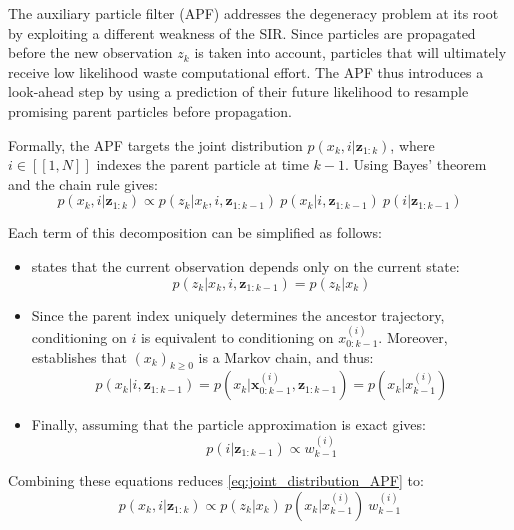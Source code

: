 The auxiliary particle filter (APF) addresses the degeneracy problem at its root by exploiting a different weakness of the SIR. Since particles are propagated before the new observation $z_k$ is taken into account, particles that will ultimately receive low likelihood waste computational effort. The APF thus introduces a look-ahead step by using a prediction of their future likelihood to resample promising parent particles before propagation.

Formally, the APF targets the joint distribution $p(x_k,i|\mathbf{z}_{1:k})$, where $i\in[\![1,N]\!]$ indexes the parent particle at time $k-1$. Using Bayes' theorem and the chain rule gives:
\begin{equation}
	p(x_k,i|\mathbf{z}_{1:k})\propto p(z_k|x_k,i,\mathbf{z}_{1:k-1})\:p(x_k|i,\mathbf{z}_{1:k-1})\:p(i|\mathbf{z}_{1:k-1})\label{eq:joint_distribution_APF}
\end{equation}

Each term of this decomposition can be simplified as follows:
\begin{itemize}
	\item{} states that the current observation depends only on the current state:
	\begin{equation}
		p(z_k|x_k,i,\mathbf{z}_{1:k-1})=p(z_k|x_k)
	\end{equation}
	\item Since the parent index uniquely determines the ancestor trajectory, conditioning on $i$ is equivalent to conditioning on $x_{0:k-1}^{(i)}$. Moreover,  establishes that $(x_k)_{k\geq0}$ is a Markov chain, and thus:
	\begin{equation}
		p(x_k|i,\mathbf{z}_{1:k-1})=p\left(x_k|\mathbf{x}_{0:k-1}^{(i)},\mathbf{z}_{1:k-1}\right)=p\left(x_k|x_{k-1}^{(i)}\right)
	\end{equation}
	\item Finally, assuming that the particle approximation is exact gives:
	\begin{equation}
		p(i|\mathbf{z}_{1:k-1})\propto w_{k-1}^{(i)}
	\end{equation}
\end{itemize}

Combining these equations reduces \eqref{eq:joint_distribution_APF} to:
\begin{equation}
	p(x_k,i|\mathbf{z}_{1:k})\propto p\left(z_k|x_k\right)\:p\left(x_k|x_{k-1}^{(i)}\right)\:w_{k-1}^{(i)}
\end{equation}

